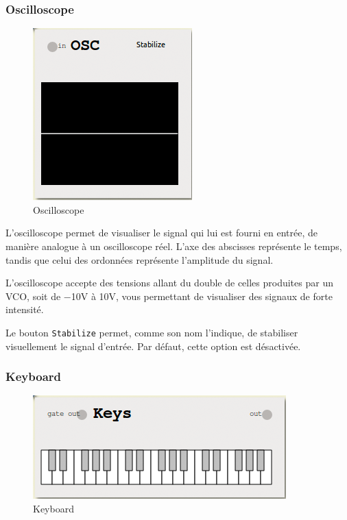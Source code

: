 \documentclass[a4paper,oneside,frenchb,12pt]{article}
\begin{document}
\subsubsection{Oscilloscope}

\begin{figure}[h!]
\centering
\includegraphics[scale=0.5]{../img/png/oscilloscope.png}
\caption{Oscilloscope}
\end{figure}

L'oscilloscope permet de visualiser le signal qui lui est fourni en
entrée, de manière analogue à un oscilloscope réel. L'axe des abscisses
représente le temps, tandis que celui des ordonnées représente
l'amplitude du signal.

L'oscilloscope accepte des tensions allant du double de celles produites
par un VCO, soit de −10V à 10V, vous permettant de visualiser des
signaux de forte intensité.

Le bouton \verb!Stabilize! permet, comme son nom l'indique, de
stabiliser visuellement le signal d'entrée. Par défaut, cette option est
désactivée.

\subsubsection{Keyboard}

\begin{figure}[h!]
\centering
\includegraphics[scale=0.5]{../img/png/keyboard.png}
\caption{Keyboard}
\end{figure}
\end{document}
